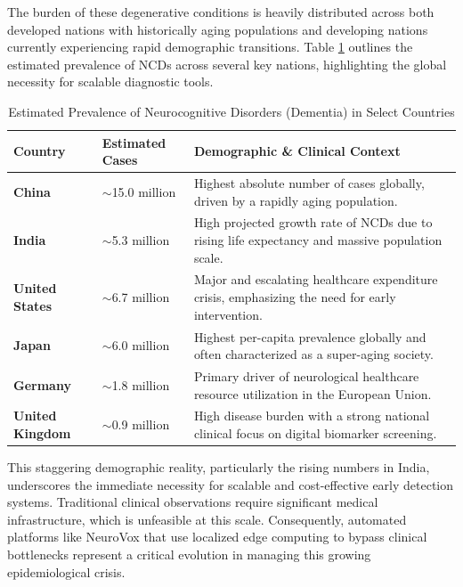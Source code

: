 \documentclass[BTech]{iitmdiss}
\begin{document}
The burden of these degenerative conditions is heavily distributed across both developed nations with historically aging populations and developing nations currently experiencing rapid demographic transitions. Table \ref{tab:ncd_prevalence} outlines the estimated prevalence of NCDs across several key nations, highlighting the global necessity for scalable diagnostic tools.

\begin{table}[htbp]
\centering
\caption{Estimated Prevalence of Neurocognitive Disorders (Dementia) in Select Countries}
\label{tab:ncd_prevalence}
\renewcommand{\arraystretch}{1.3}
\begin{tabularx}{\textwidth}{l l X}
\toprule
\textbf{Country} & \textbf{Estimated Cases} & \textbf{Demographic \& Clinical Context} \\
\midrule
\textbf{China} & $\sim$15.0 million & Highest absolute number of cases globally, driven by a rapidly aging population. \\
\textbf{India} & $\sim$5.3 million & High projected growth rate of NCDs due to rising life expectancy and massive population scale. \\
\textbf{United States} & $\sim$6.7 million & Major and escalating healthcare expenditure crisis, emphasizing the need for early intervention. \\
\textbf{Japan} & $\sim$6.0 million & Highest per-capita prevalence globally and often characterized as a super-aging society. \\
\textbf{Germany} & $\sim$1.8 million & Primary driver of neurological healthcare resource utilization in the European Union. \\
\textbf{United Kingdom} & $\sim$0.9 million & High disease burden with a strong national clinical focus on digital biomarker screening. \\
\bottomrule
\end{tabularx}
\end{table}

This staggering demographic reality, particularly the rising numbers in India, underscores the immediate necessity for scalable and cost-effective early detection systems. Traditional clinical observations require significant medical infrastructure, which is unfeasible at this scale. Consequently, automated platforms like NeuroVox that use localized edge computing to bypass clinical bottlenecks represent a critical evolution in managing this growing epidemiological crisis.
\end{document}
